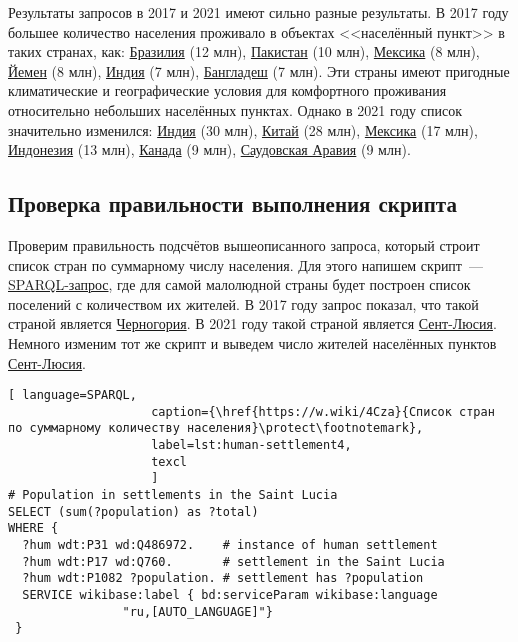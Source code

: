 Результаты запросов в 2017 и 2021 имеют сильно разные результаты. В 2017 году большее количество населения проживало в объектах <<населённый пункт>> в таких странах, как: \href{http://www.wikidata.org/entity/Q155}{Бразилия} (\num{12} млн), \href{http://www.wikidata.org/entity/Q843}{Пакистан} (\num{10} млн), \href{http://www.wikidata.org/entity/Q96}{Мексика} (\num{8} млн), \href{http://www.wikidata.org/entity/Q805}{Йемен} (\num{8} млн), \href{http://www.wikidata.org/entity/Q668}{Индия} (\num{7} млн), \href{http://www.wikidata.org/entity/Q902}{Бангладеш} (\num{7} млн). Эти страны имеют пригодные климатические и географические условия для комфортного проживания относительно небольших населённых пунктах. Однако в 2021 году список значительно изменился: \href{http://www.wikidata.org/entity/Q668}{Индия} (\num{30} млн), \href{http://www.wikidata.org/entity/Q148}{Китай} (\num{28} млн), \href{http://www.wikidata.org/entity/Q96}{Мексика} (\num{17} млн), \href{http://www.wikidata.org/entity/Q252}{Индонезия} (\num{13} млн), \href{http://www.wikidata.org/entity/Q16}{Канада} (\num{9} млн), \href{http://www.wikidata.org/entity/Q851}{Саудовская Аравия} (\num{9} млн).


\subsection{Проверка правильности выполнения скрипта}

Проверим правильность подсчётов вышеописанного запроса, который строит список стран по суммарному числу населения. Для этого напишем скрипт~---  \href{https://w.wiki/4CzZ}{SPARQL-запрос}, где для самой малолюдной страны будет построен список поселений с количеством их жителей. В 2017 году запрос показал, что такой страной является \href{http://www.wikidata.org/entity/Q236}{Черногория}. В 2021 году такой страной является \href{http://www.wikidata.org/entity/Q760}{Сент-Люсия}. Немного изменим тот же скрипт и выведем число жителей населённых пунктов \href{http://www.wikidata.org/entity/Q760}{Сент-Люсия}.

\begin{lstlisting}[ language=SPARQL, 
                    caption={\href{https://w.wiki/4Cza}{Список стран по суммарному количеству населения}\protect\footnotemark},
                    label=lst:human-settlement4,
                    texcl 
                    ]
# Population in settlements in the Saint Lucia 
SELECT (sum(?population) as ?total)
WHERE {
  ?hum wdt:P31 wd:Q486972.    # instance of human settlement
  ?hum wdt:P17 wd:Q760.       # settlement in the Saint Lucia
  ?hum wdt:P1082 ?population. # settlement has ?population
  SERVICE wikibase:label { bd:serviceParam wikibase:language 
				"ru,[AUTO_LANGUAGE]"}
 }
\end{lstlisting}%

